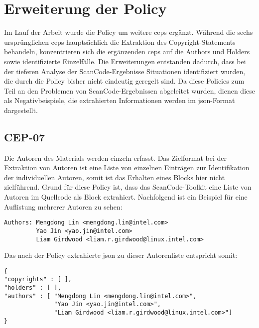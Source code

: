 

\section{Erweiterung der Policy}\label{sec:extended-policy}

Im Lauf der Arbeit wurde die Policy um weitere \glspl{cep} ergänzt.
Während die sechs ursprünglichen \glspl{cep} hauptsächlich die Extraktion des Copyright-Statements behandeln, konzentrieren sich die ergänzenden \glspl{cep} auf die Authors und Holders sowie identifizierte Einzelfälle.
Die Erweiterungen entstanden dadurch, dass bei der tieferen Analyse der ScanCode-Ergebnisse Situationen identifiziert wurden, die durch die Policy bisher nicht eindeutig geregelt sind.
Da diese Policies zum Teil an den Problemen von ScanCode-Ergebnissen abgeleitet wurden, dienen diese als Negativbeispiele, die extrahierten Informationen werden im \gls{json}-Format dargestellt.


\subsection{CEP-07}\label{subsec:cep-07}

Die Autoren des Materials werden einzeln erfasst.
Das Zielformat bei der Extraktion von Autoren ist eine Liste von einzelnen Einträgen zur Identifikation der individuellen Autoren, somit ist das Erhalten eines Blocks hier nicht zielführend.
Grund für diese Policy ist, dass das ScanCode-Toolkit eine Liste von Autoren im Quellcode als Block extrahiert.
Nachfolgend ist ein Beispiel für eine Auflistung mehrerer Autoren zu sehen:

\begin{lstlisting}[numbers=none, keepspaces=true]
Authors: Mengdong Lin <mengdong.lin@intel.com>
         Yao Jin <yao.jin@intel.com>
         Liam Girdwood <liam.r.girdwood@linux.intel.com>
\end{lstlisting}

Das nach der Policy extrahierte \gls{json} zu dieser Autorenliste entspricht somit:

\begin{lstlisting}[numbers=none, keepspaces=true]
{
"copyrights" : [ ],
"holders" : [ ],
"authors" : [ "Mengdong Lin <mengdong.lin@intel.com>",
              "Yao Jin <yao.jin@intel.com>",
              "Liam Girdwood <liam.r.girdwood@linux.intel.com>"]
}
\end{lstlisting}

